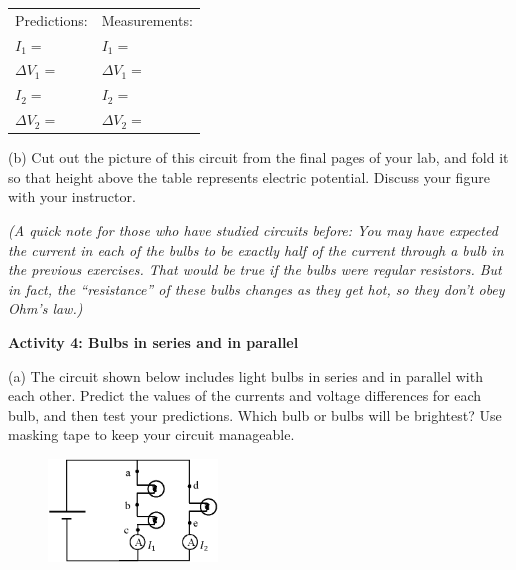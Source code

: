 \vspace{0.1 in}
\renewcommand{\arraystretch}{1.6}
\hspace*{0.5in}
\begin{tabular}{l l}
Predictions: \hspace{0.5in} & Measurements: \\
$I_1 =$ & $I_1 =$ \\
$\Delta V_1 =$ & $\Delta V_1 =$ \\
$I_2 =$ & $I_2 =$ \\
$\Delta V_2 =$ & $\Delta V_2 =$ \\
\end{tabular}
\renewcommand{\arraystretch}{1.0}
\vspace{0.3in}

(b)  Cut out the picture of this circuit from the final pages of your lab, and fold it so that height above the table represents electric potential.  Discuss your figure with your instructor. 

\textit{(A quick note for those who have studied circuits before:  You may have expected the current in each of the bulbs to be exactly half of the current through a bulb in the previous exercises.  That would be true if the bulbs were regular resistors.  But in fact, the ``resistance'' of these bulbs changes as they get hot, so they don't obey Ohm's law.)}

\textbf{Activity 4: Bulbs in series and in parallel} \par
\nopagebreak
(a) The circuit shown below includes light bulbs in series and in parallel with each other.  Predict the values of the currents and voltage differences for each bulb, and then test your predictions.  Which bulb or bulbs will be brightest? Use masking tape to keep your circuit manageable.\par

\begin{figure}
    \vspace{-1.0 in}
    \includegraphics[width=0.4\textwidth]{electric_circuits/circ_diag5.eps}
\end{figure}

